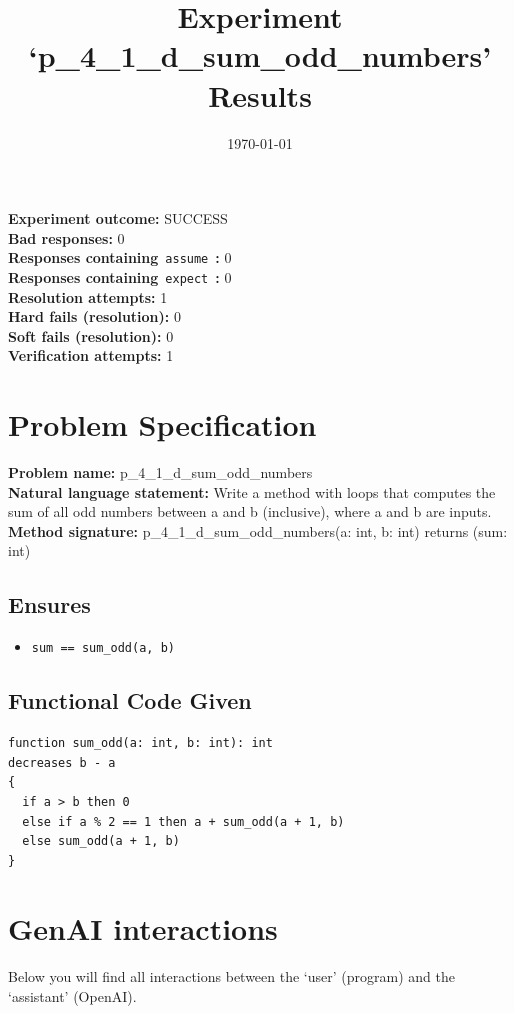 \documentclass{article}
\begin{document}
\title{Experiment `p\_4\_1\_d\_sum\_odd\_numbers' Results}
\author{\today}
\date{}
\maketitle
\textbf{Experiment outcome: }SUCCESS
\\\textbf{Bad responses: }0
\\\textbf{Responses containing}~\texttt{assume}~\textbf{: }0
\\\textbf{Responses containing}~\texttt{expect}~\textbf{: }0
\\\textbf{Resolution attempts: }1
\\\textbf{Hard fails (resolution): }0
\\\textbf{Soft fails (resolution): }0
\\\textbf{Verification attempts: }1
\section*{Problem Specification}
\textbf{Problem name: }p\_4\_1\_d\_sum\_odd\_numbers
\\\textbf{Natural language statement: }Write a method with loops that computes the sum of all odd numbers between a and b (inclusive), where a and b are inputs.
\\\textbf{Method signature: }p\_4\_1\_d\_sum\_odd\_numbers(a: int, b: int) returns (sum: int)
\subsection*{Ensures}
\begin{itemize}
\item \texttt{sum == sum\_odd(a, b)}
\end{itemize}
\subsection*{Functional Code Given}
\begin{lstlisting}
function sum_odd(a: int, b: int): int
decreases b - a
{
  if a > b then 0
  else if a % 2 == 1 then a + sum_odd(a + 1, b)
  else sum_odd(a + 1, b)
}
\end{lstlisting}
\clearpage
\section*{GenAI interactions}
Below you will find all interactions between the `user' (program) and the `assistant' (OpenAI).
\end{document}
